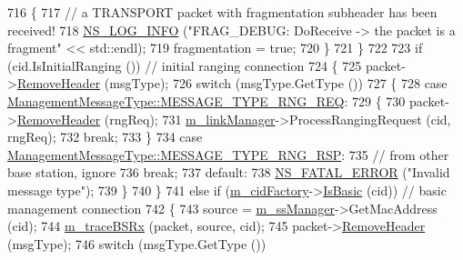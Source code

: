 \begin{DoxyCode}
716             \{
717               \textcolor{comment}{// a TRANSPORT packet with fragmentation subheader has been received!}
718               \hyperlink{group__logging_gafbd73ee2cf9f26b319f49086d8e860fb}{NS\_LOG\_INFO} (\textcolor{stringliteral}{"FRAG\_DEBUG: DoReceive -> the packet is a fragment"} << std::endl);
719               fragmentation = \textcolor{keyword}{true};
720             \}
721         \}
722 
723       \textcolor{keywordflow}{if} (cid.IsInitialRanging ()) \textcolor{comment}{// initial ranging connection}
724         \{
725           packet->\hyperlink{classns3_1_1Packet_a0961eccf975d75f902d40956c93ba63e}{RemoveHeader} (msgType);
726           \textcolor{keywordflow}{switch} (msgType.GetType ())
727             \{
728             \textcolor{keywordflow}{case} \hyperlink{classns3_1_1ManagementMessageType_a0e0c7a1e263538f0379d1bdb015abe3dacef47c5246aa3c32cee3ac10411734fe}{ManagementMessageType::MESSAGE\_TYPE\_RNG\_REQ}:
729               \{
730                 packet->\hyperlink{classns3_1_1Packet_a0961eccf975d75f902d40956c93ba63e}{RemoveHeader} (rngReq);
731                 \hyperlink{classns3_1_1BaseStationNetDevice_af69e5b5c16f3fe5d6549cfc21340b7fa}{m\_linkManager}->ProcessRangingRequest (cid, rngReq);
732                 \textcolor{keywordflow}{break};
733               \}
734             \textcolor{keywordflow}{case} \hyperlink{classns3_1_1ManagementMessageType_a0e0c7a1e263538f0379d1bdb015abe3dacc6d687507c639e29ca78b926d6345e1}{ManagementMessageType::MESSAGE\_TYPE\_RNG\_RSP}:
735               \textcolor{comment}{// from other base station, ignore}
736               \textcolor{keywordflow}{break};
737             \textcolor{keywordflow}{default}:
738               \hyperlink{group__fatal_ga5131d5e3f75d7d4cbfd706ac456fdc85}{NS\_FATAL\_ERROR} (\textcolor{stringliteral}{"Invalid message type"});
739             \}
740         \}
741       \textcolor{keywordflow}{else} \textcolor{keywordflow}{if} (\hyperlink{classns3_1_1BaseStationNetDevice_a40be478b4658b283435187caccba30ff}{m\_cidFactory}->\hyperlink{classns3_1_1CidFactory_a7d70ebd7630a8414ce3eefb7580bdc57}{IsBasic} (cid)) \textcolor{comment}{// basic management connection}
742         \{
743           source = \hyperlink{classns3_1_1BaseStationNetDevice_a2365fd053319dda930081e661e6381a6}{m\_ssManager}->GetMacAddress (cid);
744           \hyperlink{classns3_1_1BaseStationNetDevice_a0eb479748371aa4a19d45a57434020b8}{m\_traceBSRx} (packet, source, cid);
745           packet->\hyperlink{classns3_1_1Packet_a0961eccf975d75f902d40956c93ba63e}{RemoveHeader} (msgType);
746           \textcolor{keywordflow}{switch} (msgType.GetType ())

\end{DoxyCode}
